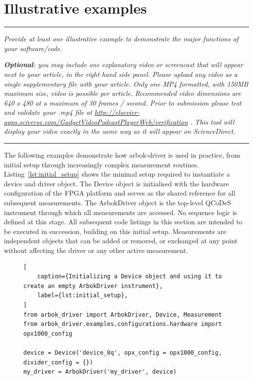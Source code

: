 \documentclass[numbers, preprint, twocolumn,10pt]{elsarticle}
\newenvironment{instructions}
  {\hrule\vspace{4pt}\begingroup\color{red}\itshape}
  {\endgroup\hrule\vspace{4pt}}
\begin{document}
\section{Illustrative examples}\label{sec:examples}
\begin{instructions}
    \textit{Provide at least one illustrative example to demonstrate the major
    functions of your software/code.}
    
    \textit{
        \textbf{Optional}: you may include one explanatory  video or screencast that will appear next to your article, in the right hand side panel. Please upload any video as a single supplementary file with your article. Only one MP4 formatted, with 150MB maximum size, video is possible per article. Recommended video dimensions are 640 x 480 at a maximum of 30 frames / second. Prior to submission please test and validate your .mp4 file at  \url{http://elsevier-apps.sciverse.com/GadgetVideoPodcastPlayerWeb/verification} . This tool will display your video exactly in the same way as it will appear on ScienceDirect.
        }
\end{instructions}
\noindent
The following examples demonstrate how arbok-driver is used in practice, from initial setup through increasingly complex measurement routines. Listing~\ref{lst:initial_setup} shows the minimal setup required to instantiate a device and driver object. The Device object is initialised with the hardware configuration of the FPGA platform and serves as the shared reference for all subsequent measurements. The ArbokDriver object is the top-level QCoDeS instrument through which all measurements are accessed. No sequence logic is defined at this stage. All subsequent code listings in this section are intended to be executed in succession, building on this initial setup.
Measurements are independent objects that can be added or removed, or exchanged at any point without affecting the driver or any other active measurement. %
\begin{figure}
\begin{lstlisting}[
    caption={Initializing a Device object and using it to create an empty ArbokDriver instrument},
    label={lst:initial_setup},
]
from arbok_driver import ArbokDriver, Device, Measurement
from arbok_driver.examples.configurations.hardware import opx1000_config

device = Device('device_8q', opx_config = opx1000_config, divider_config = {})
my_driver = ArbokDriver('my_driver', device)
\end{lstlisting}
\end{figure}
\end{document}
